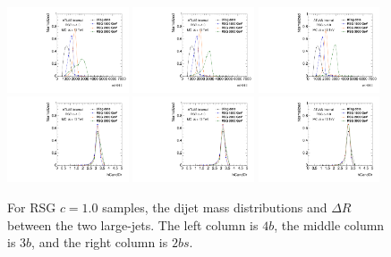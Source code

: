 \begin{figure}[htbp!]
\begin{center}
\includegraphics[width=0.32\textwidth,angle=-90]{figures/boosted/Truth/Moriond_comp_0_FourTag_Signal_mHH_l.pdf}
\includegraphics[width=0.32\textwidth,angle=-90]{figures/boosted/Truth/Moriond_comp_0_ThreeTag_Signal_mHH_l.pdf}
\includegraphics[width=0.32\textwidth,angle=-90]{figures/boosted/Truth/Moriond_comp_0_TwoTag_split_Signal_mHH_l.pdf}\\
\includegraphics[width=0.32\textwidth,angle=-90]{figures/boosted/Truth/Moriond_comp_0_FourTag_Signal_hCandDr.pdf}
\includegraphics[width=0.32\textwidth,angle=-90]{figures/boosted/Truth/Moriond_comp_0_ThreeTag_Signal_hCandDr.pdf}
\includegraphics[width=0.32\textwidth,angle=-90]{figures/boosted/Truth/Moriond_comp_0_TwoTag_split_Signal_hCandDr.pdf}\\
\caption{For RSG $c=1.0$ samples, the dijet mass distributions and $\Delta R$ between the two large-\R jets. The left column is $4b$, the middle column is $3b$, and the right column is $2bs$.}
\label{fig:app-signal-jj}
\end{center}
\end{figure}


